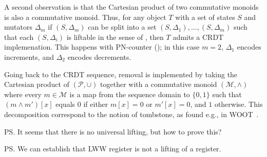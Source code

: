 A second observation is that the Cartesian product of two commutative monoids is also a commutative monoid.
Thus, for any object $T$ with a set of states $S$ and mutators $\Delta_m$ if $(S,\Delta_m)$ can be split into a set $(S,\Delta_1), \ldots, (S,\Delta_m)$ such that each $(S,\Delta_i)$ is liftable in the sense of , then $T$ admits a CRDT implemenation.
%
This happens with PN-counter ();
in this case $m=2$, $\Delta_1$ encodes increments, and $\Delta_2$ encodes decrements.

Going back to the CRDT sequence, removal is implemented by taking the Cartesian product of $(\mathcal{P}, \cup)$ together with a commutative monoid $(\mathcal{M}, \land)$ where every $m \in \mathcal{M}$ is a map from the sequence domain to $\{0,1\}$ such that $(m \land m')[x]$ equals $0$ if either $m[x]=0$ or $m'[x]=0$, and $1$ otherwise.
This decomposition correspond to the notion of tombstone, as found e.g., in WOOT~\cite{woot}.


\ps{It seems that there is no universal lifting, but how to prove this?}

\ps{We can establish that LWW register is not a lifting of a register.}
